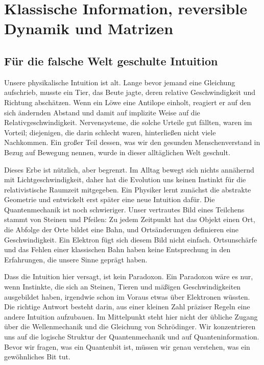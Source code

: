 \chapter{Klassische Information, reversible Dynamik und Matrizen}


\section{Für die falsche Welt geschulte Intuition}

Unsere physikalische Intuition ist alt. Lange bevor jemand eine Gleichung aufschrieb, musste ein Tier, das Beute jagte, deren relative Geschwindigkeit und Richtung abschätzen. Wenn ein Löwe eine Antilope einholt, reagiert er auf den sich ändernden Abstand und damit auf implizite Weise auf die Relativgeschwindigkeit. Nervensysteme, die solche Urteile gut fällten, waren im Vorteil; diejenigen, die darin schlecht waren, hinterließen nicht viele Nachkommen. Ein großer Teil dessen, was wir den gesunden Menschenverstand in Bezug auf Bewegung nennen, wurde in dieser alltäglichen Welt geschult.

Dieses Erbe ist nützlich, aber begrenzt. Im Alltag bewegt sich nichts annähernd mit Lichtgeschwindigkeit, daher hat die Evolution uns keinen Instinkt für die relativistische Raumzeit mitgegeben. Ein Physiker lernt zunächst die abstrakte Geometrie und entwickelt erst später eine neue Intuition dafür. Die Quantenmechanik ist noch schwieriger. Unser vertrautes Bild eines Teilchens stammt von Steinen und Pfeilen: Zu jedem Zeitpunkt hat das Objekt einen Ort, die Abfolge der Orte bildet eine Bahn, und Ortsänderungen definieren eine Geschwindigkeit. Ein Elektron fügt sich diesem Bild nicht einfach. Ortsunschärfe und das Fehlen einer klassischen Bahn haben keine Entsprechung in den Erfahrungen, die unsere Sinne geprägt haben.

Dass die Intuition hier versagt, ist kein Paradoxon. Ein Paradoxon wäre es nur, wenn Instinkte, die sich an Steinen, Tieren und mäßigen Geschwindigkeiten ausgebildet haben, irgendwie schon im Voraus etwas über Elektronen wüssten. Die richtige Antwort besteht darin, aus einer kleinen Zahl präziser Regeln eine andere Intuition aufzubauen. Im Mittelpunkt steht hier nicht der übliche Zugang über die Wellenmechanik und die Gleichung von Schr\"odinger. Wir konzentrieren uns auf die logische Struktur der Quantenmechanik und auf Quanteninformation. Bevor wir fragen, was ein Quantenbit ist, müssen wir genau verstehen, was ein gewöhnliches Bit tut.


